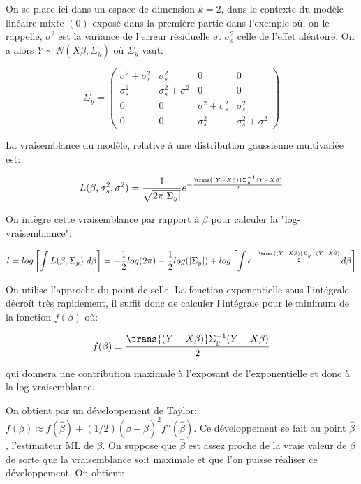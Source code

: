 \vspace{4mm}

On se place ici dans un espace de dimension $k=2$, dans le contexte du modèle linéaire mixte $(0)$ exposé dans la première partie dans l'exemple où, on le rappelle, $\sigma^2$ est la variance de l'erreur résiduelle et $\sigma^2_s$ celle de l'effet aléatoire. On a alors $ Y \sim N(X\beta, \Sigma_y)$ où $\Sigma_y$ vaut:

\[ \Sigma_y = \begin{pmatrix} \sigma^2+\sigma_s^2 & \sigma_s^2 & 0 & 0 \\ \sigma_s^2 & \sigma_s^2+\sigma^2 & 0 & 0 \\ 0 & 0 & \sigma^2+\sigma_s^2 & \sigma_s^2 \\ 0 & 0 & \sigma_s^2 & \sigma_s^2+\sigma^2 \end{pmatrix}\]

\vspace{4mm}

La vraisemblance du modèle, relative à une distribution gaussienne multivariée est:

\[L(\beta, \sigma_s^2, \sigma^2) = \frac{1}{\sqrt{2\pi |\Sigma_y|}}e^{-\frac{\trans{(Y-X\beta)}\Sigma_y^{-1}(Y-X\beta)}{2}}\]

\vspace{4mm}

On intègre cette vraisemblance par rapport à $\beta$ pour calculer la "log-vraisemblance":

$$l=log\left[\int L(\beta, \Sigma_y) \ d\beta\right] = -\frac{1}{2}log(2\pi)-\frac{1}{2}log(|\Sigma_y|)+log\left[\int e^{-\frac{\trans{(Y-X\beta)}\Sigma_y^{-1}(Y-X\beta)}{2}} d\beta\right]$$

\vspace{4mm}

On utilise l'approche du point de selle. La fonction exponentielle sous l'intégrale décroît très rapidement, il suffit donc de calculer l'intégrale pour le minimum de la fonction $f(\beta)$ où:

$$f(\beta)=\frac{\trans{(Y-X\beta)}\Sigma_y^{-1}(Y-X\beta)}{2}$$ 

qui donnera une contribution maximale à l'exposant de l'exponentielle et donc à la log-vraisemblance. 

\vspace{4mm}

On obtient par un développement de Taylor: $f(\beta)\approx f(\hat{\beta})+(1/2)(\beta-\hat{\beta})^2f''(\hat{\beta})$. Ce développement se fait au point $\hat{\beta}$, l'estimateur \rm{ML} de $\beta$. On suppose que $\hat{\beta}$ est assez proche de la vraie valeur de $\beta$ de sorte que la vraisemblance soit maximale et que l'on puisse réaliser ce développement. On obtient:


